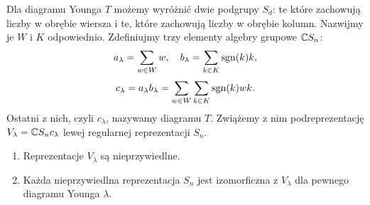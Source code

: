 Dla diagramu Younga $T$ możemy wyróżnić dwie podgrupy $S_d$: te które zachowują liczby w obrębie wiersza i te, które zachowują liczby w obrębie kolumn. Nazwijmy je $W$ i $K$ odpowiednio. Zdefiniujmy trzy elementy algebry grupowe $\mathbb{C} S_n$:
$$a_\lambda=\sum_{w\in W}w,\quad b_\lambda=\sum_{k\in K}\operatorname{sgn}(k)k,$$
$$c_\lambda=a_\lambda b_\lambda=\sum_{w\in W}\sum_{k\in K}\operatorname{sgn}(k)wk.$$
Ostatni z nich, czyli $c_\lambda$, nazywamy  diagramu $T$. Zwiążemy z nim podreprezentację $V_\lambda=\mathbb{C} S_nc_\lambda$ lewej regularnej reprezentacji $S_n$.

\begin{theorem}{}{}\mbox{}
  \begin{enumerate} 
    \item Reprezentacje $V_\lambda$ są nieprzywiedlne.
    \item Każda nieprzywiedlna reprezentacja $S_n$ jest izomorficzna z $V_\lambda$ dla pewnego diagramu Younga $\lambda$.
  \end{enumerate}
\end{theorem}

